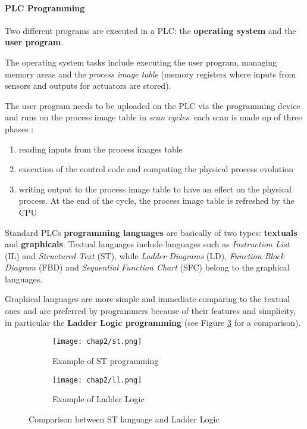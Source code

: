 \paragraph{PLC Programming}
\label{subsubsec:2_plc_programming}
Two different programs are executed in a PLC: the \textbf{operating system} and the \textbf{user program}.

\bigskip
The operating system tasks include executing the user program, managing memory areas and the \textit{process image table} (memory registers where inputs from sensors and outputs for actuators are stored).

\bigskip
The user program needs to be uploaded on the PLC via the programming device and runs on the process image table in \textit{scan cycles}: each scan is made up of three phases \cite{ceccato}:

\begin{enumerate}
	\item reading inputs from the process images table
	
	\item execution of the control code and computing the physical process evolution
	
	\item writing output to the process image table to have an effect on the physical process. At the end of the cycle, the process image table is refreshed by the CPU
\end{enumerate}

Standard PLCs \textbf{programming languages} are basically of two types: \textbf{textuals} and \textbf{graphicals}.
Textual languages include languages such as \textit{Instruction List} (IL) and \textit{Structured Text} (ST), while \textit{Ladder Diagrams} (LD), \textit{Function Block Diagram} (FBD) and \textit{Sequential Function Chart} (SFC) belong to the graphical languages.

\bigskip
Graphical languages are more simple and immediate comparing to the textual ones and are preferred by programmers because of their features and simplicity, in particular the \textbf{Ladder Logic programming} (see Figure \ref{fig:st_ll_comparison} for a comparison).

\begin{figure}[ht]
	\centering
	\begin{subfigure}{0.47\textwidth}
		\texttt{[image: chap2/st.png]}
		\caption{Example of ST programming}
		\label{subfig:st_example}
	\end{subfigure}
	\hfill
	\begin{subfigure}{0.47\textwidth}
		\texttt{[image: chap2/ll.png]}
		\caption{Example of Ladder Logic}
		\label{subfig:ladder_logic_example}
	\end{subfigure}
	\caption{Comparison between ST language and Ladder Logic}
	\label{fig:st_ll_comparison}
	
\end{figure}

